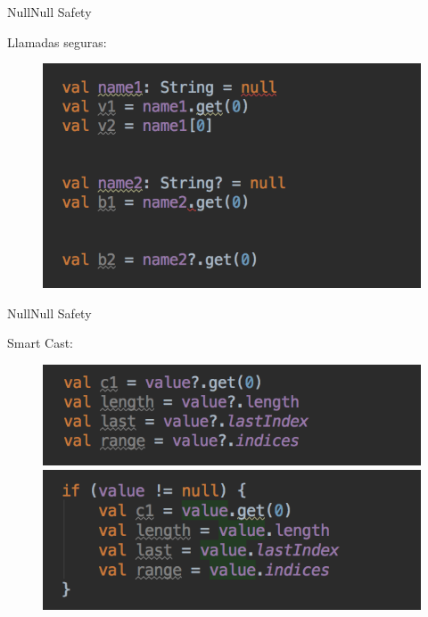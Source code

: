 \begin{frame}{Null}{Null Safety}
  \begin{block}{Llamadas seguras:}
    \begin{figure}[h]
    \centering
    \includegraphics[width=\textwidth]{images/kotlin_vs_java/null_2}
    \end{figure}
     \end{block}
\end{frame}

\begin{frame}{Null}{Null Safety}
  \begin{block}{Smart Cast:}
    \begin{figure}[h]
    \centering
    \includegraphics[width=\textwidth]{images/kotlin_vs_java/null_3}
    \vspace{0pt}
    \includegraphics[width=\textwidth]{images/kotlin_vs_java/null_4}
    \end{figure}
     \end{block}
\end{frame}

